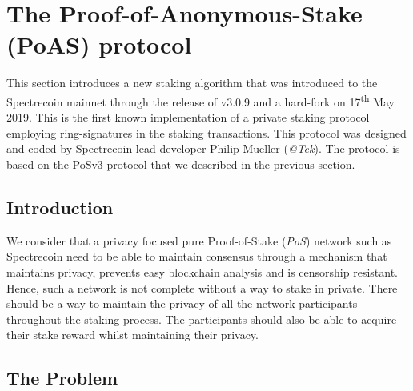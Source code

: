\chapter{The Proof-of-Anonymous-Stake (PoAS) protocol}
This section introduces a new staking algorithm that was introduced to the 
Spectrecoin mainnet through the release of v3.0.9 and a hard-fork on 
17\textsuperscript{th} May 2019. This is the first known implementation 
of a private staking protocol employing ring-signatures in the staking 
transactions. This protocol was designed and coded by Spectrecoin lead 
developer Philip Mueller (\textit{@Tek}). The protocol is based on the 
PoSv3 protocol that we described in the previous section.



\section{Introduction}
We consider that a privacy focused pure Proof-of-Stake (\textit{PoS}) 
network such as Spectrecoin need to be able to maintain consensus through 
a mechanism that maintains privacy, prevents easy blockchain analysis and 
is censorship resistant. Hence, such a network is not complete without a 
way to stake in private. There should be a way to maintain the privacy of 
all the network participants throughout the staking process. The 
participants should also be able to acquire their stake reward whilst 
maintaining their privacy.



\section{The Problem}


